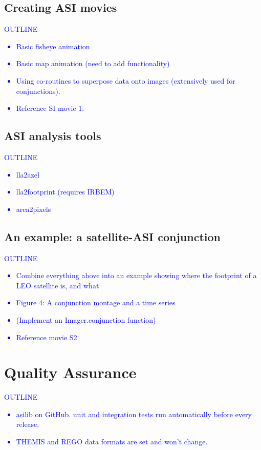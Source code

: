 \documentclass[draft]{agujournal2019}
\begin{document}
\subsection{Creating ASI movies}
\textcolor{blue}{
      OUTLINE
      \begin{itemize}
            \item Basic fisheye animation
            \item Basic map animation (need to add functionality)
            \item Using co-routines to superpose data onto images (extensively used for conjunctions).
            \item Reference SI movie 1.
      \end{itemize}
}

\subsection{ASI analysis tools}
\textcolor{blue}{
      OUTLINE
      \begin{itemize}
            \item lla2azel
            \item lla2footprint (requires IRBEM)
            \item area2pixels
      \end{itemize}
}

\subsection{An example: a satellite-ASI conjunction}
\textcolor{blue}{
      OUTLINE
      \begin{itemize}
            \item Combine everything above into an example showing where the footprint of a LEO satellite is, and what 
            \item Figure 4: A conjunction montage and a time series
            \item (Implement an Imager.conjunction function)
            \item Reference movie S2
      \end{itemize}
}

\section{Quality Assurance}
\textcolor{blue}{
      OUTLINE
      \begin{itemize}
            \item asilib on GitHub. unit and integration tests run automatically before every release.
            \item THEMIS and REGO data formats are set and won't change.
      \end{itemize}
}
\end{document}
